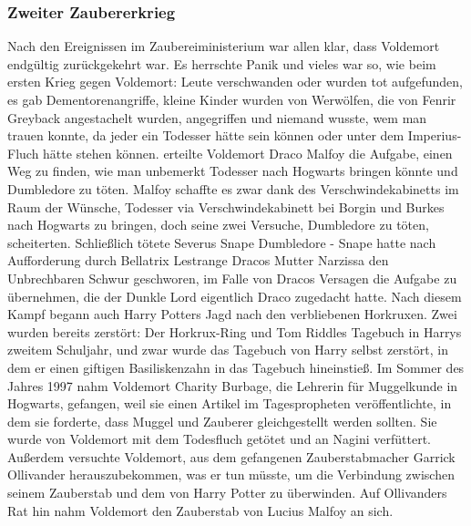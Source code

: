\documentclass[a4paper, 10pt]{article}
\begin{document}
\subsubsection*{\large Zweiter Zaubererkrieg}
Nach den Ereignissen im Zaubereiministerium war allen klar, dass Voldemort endgültig zurückgekehrt war. Es herrschte Panik und vieles war so, wie beim ersten Krieg gegen Voldemort: Leute verschwanden oder wurden tot aufgefunden, es gab Dementorenangriffe, kleine Kinder wurden von Werwölfen, die von Fenrir Greyback angestachelt wurden, angegriffen und niemand wusste, wem man trauen konnte, da jeder ein Todesser hätte sein können oder unter dem Imperius-Fluch hätte stehen können.
\vspace{10pt}
 erteilte Voldemort Draco Malfoy die Aufgabe, einen Weg zu finden, wie man unbemerkt Todesser nach Hogwarts bringen könnte und Dumbledore zu töten. Malfoy schaffte es zwar dank des Verschwindekabinetts im Raum der Wünsche, Todesser via Verschwindekabinett bei Borgin und Burkes nach Hogwarts zu bringen, doch seine zwei Versuche, Dumbledore zu töten, scheiterten. Schließlich tötete Severus Snape Dumbledore - Snape hatte nach Aufforderung durch Bellatrix Lestrange Dracos Mutter Narzissa den Unbrechbaren Schwur geschworen, im Falle von Dracos Versagen die Aufgabe zu übernehmen, die der Dunkle Lord eigentlich Draco zugedacht hatte.
\vspace{10pt}
\newline
Nach diesem Kampf begann auch Harry Potters Jagd nach den verbliebenen Horkruxen. Zwei wurden bereits zerstört: Der Horkrux-Ring und Tom Riddles Tagebuch in Harrys zweitem Schuljahr, und zwar wurde das Tagebuch von Harry selbst zerstört, in dem er einen giftigen Basiliskenzahn in das Tagebuch hineinstieß.
\vspace{10pt}
\newline
Im Sommer des Jahres 1997 nahm Voldemort Charity Burbage, die Lehrerin für Muggelkunde in Hogwarts, gefangen, weil sie einen Artikel im Tagespropheten veröffentlichte, in dem sie forderte, dass Muggel und Zauberer gleichgestellt werden sollten. Sie wurde von Voldemort mit dem Todesfluch getötet und an Nagini verfüttert. Außerdem versuchte Voldemort, aus dem gefangenen Zauberstabmacher Garrick Ollivander herauszubekommen, was er tun müsste, um die Verbindung zwischen seinem Zauberstab und dem von Harry Potter zu überwinden. Auf Ollivanders Rat hin nahm Voldemort den Zauberstab von Lucius Malfoy an sich.
\vspace{10pt}
\end{document}

